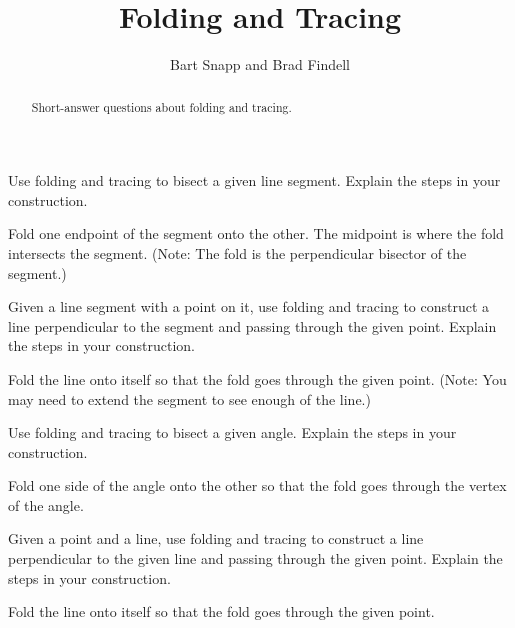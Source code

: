 \documentclass[nooutcomes]{ximera}
\title{Folding and Tracing}
\author{Bart Snapp and Brad Findell}
\begin{document}
\begin{abstract}
Short-answer questions about folding and tracing. 
\end{abstract}
\maketitle

%

\begin{problem}
Use folding and tracing to bisect a given line segment. Explain the steps in
  your construction.
\begin{hint}
Fold one endpoint of the segment onto the other.  The midpoint is where the fold intersects the segment.  (Note: The fold is the perpendicular bisector of the segment.)
\end{hint}
\end{problem}

\begin{problem}
Given a line segment with a point on it, use folding and tracing to
  construct a line perpendicular to the segment and passing through
  the given point. Explain the steps in your construction.
\begin{hint}
Fold the line onto itself so that the fold goes through the given point.  (Note: You may need to extend the segment to see enough of the line.)
\end{hint}
\end{problem}

\begin{problem}
Use folding and tracing to bisect a given angle. Explain the steps in your
  construction.
\begin{hint}
Fold one side of the angle onto the other so that the fold goes through the vertex of the angle. 
\end{hint}
\end{problem}

\begin{problem}
Given a point and a line, use folding and tracing to construct a line
  perpendicular to the given line and passing through the given
  point. Explain the steps in your construction.
\begin{hint}
Fold the line onto itself so that the fold goes through the given point. 
\end{hint}
\end{problem}
\end{document}
